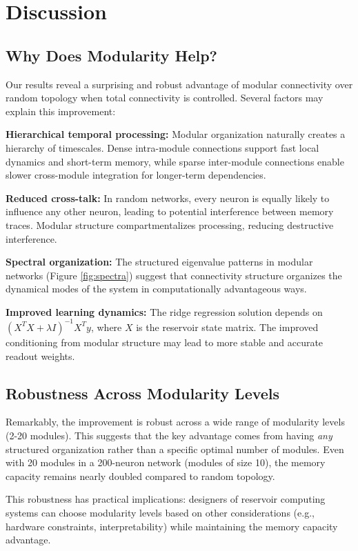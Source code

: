 \documentclass{article}
\begin{document}
\section{Discussion}

\subsection{Why Does Modularity Help?}

Our results reveal a surprising and robust advantage of modular connectivity over random topology when total connectivity is controlled. Several factors may explain this improvement:

\textbf{Hierarchical temporal processing:} Modular organization naturally creates a hierarchy of timescales. Dense intra-module connections support fast local dynamics and short-term memory, while sparse inter-module connections enable slower cross-module integration for longer-term dependencies.

\textbf{Reduced cross-talk:} In random networks, every neuron is equally likely to influence any other neuron, leading to potential interference between memory traces. Modular structure compartmentalizes processing, reducing destructive interference.

\textbf{Spectral organization:} The structured eigenvalue patterns in modular networks (Figure \ref{fig:spectra}) suggest that connectivity structure organizes the dynamical modes of the system in computationally advantageous ways.

\textbf{Improved learning dynamics:} The ridge regression solution depends on $(X^TX + \lambda I)^{-1}X^Ty$, where $X$ is the reservoir state matrix. The improved conditioning from modular structure may lead to more stable and accurate readout weights.

\subsection{Robustness Across Modularity Levels}

Remarkably, the improvement is robust across a wide range of modularity levels (2-20 modules). This suggests that the key advantage comes from having \textit{any} structured organization rather than a specific optimal number of modules. Even with 20 modules in a 200-neuron network (modules of size 10), the memory capacity remains nearly doubled compared to random topology.

This robustness has practical implications: designers of reservoir computing systems can choose modularity levels based on other considerations (e.g., hardware constraints, interpretability) while maintaining the memory capacity advantage.
\end{document}
